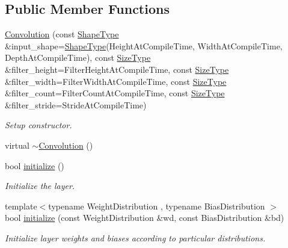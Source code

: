 \subsection*{Public Member Functions}
\begin{DoxyCompactItemize}
\item 
\hyperlink{classffnn_1_1layer_1_1_convolution_a4044f7f7c7da658c29df433873efd97a}{Convolution} (const \hyperlink{classffnn_1_1layer_1_1_convolution_af048fd677e8749bb295fac8d330ad843}{Shape\-Type} \&input\-\_\-shape=\hyperlink{classffnn_1_1layer_1_1_convolution_af048fd677e8749bb295fac8d330ad843}{Shape\-Type}(Height\-At\-Compile\-Time, Width\-At\-Compile\-Time, Depth\-At\-Compile\-Time), const \hyperlink{classffnn_1_1layer_1_1_convolution_a9599a1f35642eb9b9f516659507ae58d}{Size\-Type} \&filter\-\_\-height=Filter\-Height\-At\-Compile\-Time, const \hyperlink{classffnn_1_1layer_1_1_convolution_a9599a1f35642eb9b9f516659507ae58d}{Size\-Type} \&filter\-\_\-width=Filter\-Width\-At\-Compile\-Time, const \hyperlink{classffnn_1_1layer_1_1_convolution_a9599a1f35642eb9b9f516659507ae58d}{Size\-Type} \&filter\-\_\-count=Filter\-Count\-At\-Compile\-Time, const \hyperlink{classffnn_1_1layer_1_1_convolution_a9599a1f35642eb9b9f516659507ae58d}{Size\-Type} \&filter\-\_\-stride=Stride\-At\-Compile\-Time)
\begin{DoxyCompactList}\small\item\em Setup constructor. \end{DoxyCompactList}\item 
virtual \hyperlink{classffnn_1_1layer_1_1_convolution_a97039c63b91f22be8ab43628a32cea7b}{$\sim$\-Convolution} ()
\item 
bool \hyperlink{classffnn_1_1layer_1_1_convolution_a6db8aa87e5044aa30f538091339c2994}{initialize} ()
\begin{DoxyCompactList}\small\item\em Initialize the layer. \end{DoxyCompactList}\item 
{\footnotesize template$<$typename Weight\-Distribution , typename Bias\-Distribution $>$ }\\bool \hyperlink{classffnn_1_1layer_1_1_convolution_aad316b3dee60666461c231d9dfbb0041}{initialize} (const Weight\-Distribution \&wd, const Bias\-Distribution \&bd)
\begin{DoxyCompactList}\small\item\em Initialize layer weights and biases according to particular distributions. \end{DoxyCompactList}\item 

\end{DoxyCompactItemize}
